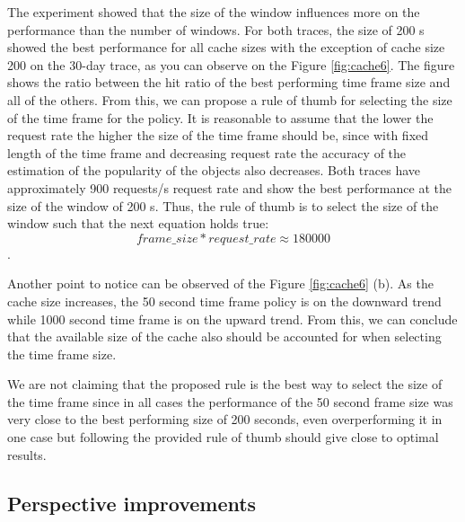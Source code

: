 The experiment showed that the size of the window influences more on the performance than the number of windows. For both traces, the size of 200 s showed the best performance for all cache sizes with the exception of cache size 200 on the 30-day trace, as you can observe on the Figure \ref{fig:cache6}. The figure shows the ratio between the hit ratio of the best performing time frame size and all of the others. From this, we can propose a rule of thumb for selecting the size of the time frame for the policy. It is reasonable to assume that the lower the request rate the higher the size of the time frame should be, since with fixed length of the time frame and decreasing request rate the accuracy of the estimation of the popularity of the objects also decreases. Both traces have approximately 900 requests/s request rate and show the best performance at the size of the window of 200 s. Thus, the rule of thumb is to select the size of the window such that the next equation holds true: $$ frame\_size * request\_rate \approx  180000 $$.

Another point to notice can be observed of the Figure \ref{fig:cache6} (b). As the cache size increases, the 50 second time frame policy is on the downward trend while 1000 second time frame is on the upward trend.  From this, we can conclude that the available size of the cache also should be accounted for when selecting the time frame size.

We are not claiming that the proposed rule is the best way to select the size of the time frame since in all cases the performance of the 50 second frame size was very close to the best performing size of 200 seconds, even overperforming it in one case but following the provided rule of thumb should give close to optimal results.

\subsection{Perspective improvements} \label{perspective_improvements}


